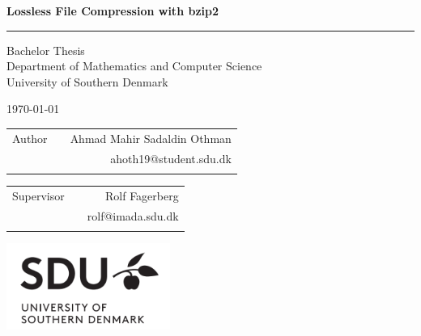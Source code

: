 \documentclass{article}
\begin{document}
\begin{titlepage}
\Large
\renewcommand{\thepage}{Title}
\thispagestyle{empty}
\begin{center}
   \vspace*{1cm}
\linespread{1.25}
       {\doublespacing \Huge \textbf{Lossless File Compression with bzip2}}
\linespread{1}
       \rule{\linewidth}{1pt}
       {\huge Bachelor Thesis \\[1ex]
       \Large Department of Mathematics and Computer Science \\
       University of Southern Denmark}
       
    \vspace*{1cm}
    \large \today
\end{center}
\vspace{4cm}
\Large
\begin{tabularx}{\textwidth}{lXr}
    Author & & Ahmad Mahir Sadaldin Othman\\ 
    & & ahoth19@student.sdu.dk\\ \\
\end{tabularx}
\begin{tabularx}{\textwidth}{lXr}
    Supervisor & & Rolf Fagerberg \\
    & & rolf@imada.sdu.dk \\ \\
\end{tabularx}

\vfill
\centering
\includegraphics[width=0.4\textwidth]{images/sdulogo.png}
\end{titlepage}



\newpage
\end{document}

